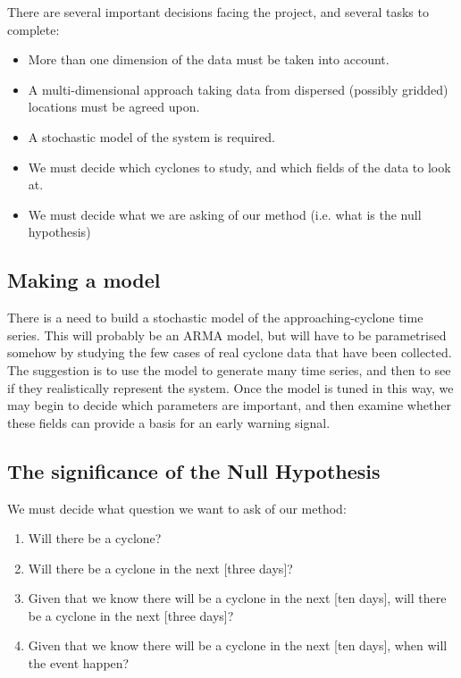 \documentclass[11pt,a4paper,reqno]{article}
\numberwithin{equation}{section}
\begin{document}
There are several important decisions facing the project, and several tasks to complete:

\begin{itemize}
\item More than one dimension of the data must be taken into account.
\item A multi-dimensional approach taking data from dispersed (possibly gridded) locations must be agreed upon.
\item A stochastic model of the system is required.
\item We must decide which cyclones to study, and which fields of the data to look at.
\item We must decide what we are asking of our method (i.e. what is the null hypothesis) 
\end{itemize}

\subsection{Making a model}

There is a need to build a stochastic model of the approaching-cyclone time series. This will probably be an ARMA model, but will have to be parametrised somehow  by studying the few cases of real cyclone data that have been collected. \\

The suggestion is to use the model to generate many time series, and then to see if they realistically represent the system. Once the model is tuned in this way, we may begin to decide which parameters are important, and then examine whether these fields can provide a basis for an early warning signal.

\subsection{The significance of the Null Hypothesis}
We must decide what question we want to ask of our method:

\begin{enumerate}
\item Will there be a cyclone?
\item Will there be a cyclone in the next [three days]?
\item Given that we know there will be a cyclone in the next [ten days], will there be a cyclone in the next [three days]?
\item Given that we know there will be a cyclone in the next [ten days], when will the event happen?
\end{enumerate}


\newpage

\end{document}
